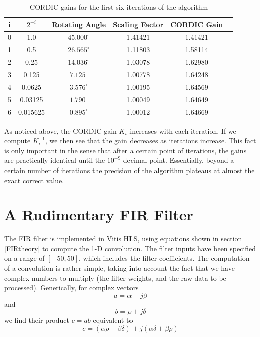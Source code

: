 \documentclass[11pt]{report}
\begin{document}
\begin{table}
\begin{center}
\begin{tabular}{|c|c|c|c|c|c|}
\hline
i & $2^{-i}$ 	& Rotating Angle  	& Scaling Factor 	& CORDIC Gain 	\\ \hline \hline
0 & 1.0 		& $45.000^{\circ}$	& 1.41421			& 1.41421		\\ \hline
1 & 0.5 		& $26.565^{\circ}$	& 1.11803			& 1.58114		\\ \hline
2 & 0.25 		& $14.036^{\circ}$	& 1.03078			& 1.62980		\\ \hline
3 & 0.125 		& $7.125^{\circ}$	& 1.00778			& 1.64248		\\ \hline
4 & 0.0625 	& $3.576^{\circ}$	& 1.00195			& 1.64569		\\ \hline
5 & 0.03125 	& $1.790^{\circ}$	& 1.00049			& 1.64649		\\ \hline
6 & 0.015625 	& $0.895^{\circ}$	& 1.00012			& 1.64669		\\ \hline
\end{tabular}
\end{center}
\caption{CORDIC gains for the first six iterations of the algorithm}
\label{table:cordic}
\end{table}
\FloatBarrier

As noticed above, the CORDIC gain $K_i$ increases with each iteration. If we compute $K_i ^{-1}$, we then see that the gain decreases as iterations increase. This fact is only important in the sense that after a certain point of iterations, the gains are practically identical until the $10^{-9}$ decimal point. Essentially, beyond a certain number of iterations the precision of the algorithm plateaus at almost the exact correct value.

\chapter{A Rudimentary \ac{FIR} Filter}

The FIR filter is implemented in Vitis HLS, using equations shown in section \ref{FIRtheory} to compute the 1-D convolution. The filter inputs have been specified on a range of $[-50, 50]$, which includes the filter coefficients. The computation of a convolution is rather simple, taking into account the fact that we have complex numbers to multiply (the filter weights, and the raw data to be processed). Generically, for complex vectors
\begin{equation}
	a = \alpha + j\beta
\end{equation}
and 
\begin{equation}
	b = \rho + j\delta
\end{equation}
we find their product $c = ab$ equivalent to
\begin{equation}
	c = (\alpha\rho - \beta\delta) + j(\alpha\delta+\beta\rho)
\end{equation}
\end{document}
